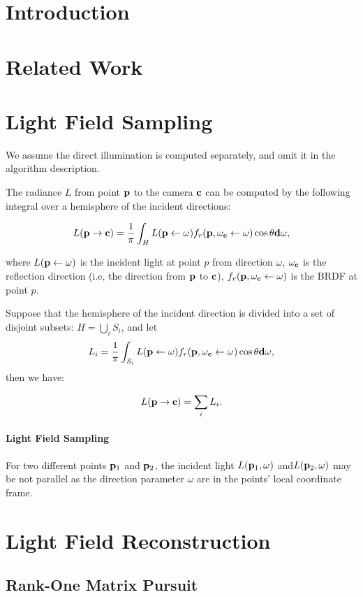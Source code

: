\documentclass[review]{acmsiggraph}
\newcommand{\bfd}{{\bf d}}
\newcommand{\bfp}{{\bf p}}
\newcommand{\bfc}{{\bf c}}
\newcommand{\Equation}[1]{
	\begin{equation}
		#1
	\end{equation}
}
\begin{document}
\section{Introduction}

\section{Related Work}

\section{Light Field Sampling}
We assume the direct illumination is computed separately, and omit it in the algorithm description. 

The radiance $L$ from point $\bfp$ to the camera $\bfc$ can be computed by the following integral over a hemisphere of the incident directions:
\Equation{\nonumber
	L(\bfp\rightarrow \bfc) = \frac{1}{\pi} \int_H L(\bfp \leftarrow \omega) f_r(\bfp, \omega_\bfc \leftarrow \omega) \cos\theta \bfd\omega,
}
where $L(\bfp \leftarrow \omega)$ is the incident light at point $p$ from direction $\omega$, $\omega_\bfc$ is the reflection direction (i.e, the direction from $\bfp$ to $\bfc$), $f_r(\bfp,\omega_\bfc\leftarrow\omega)$ is the BRDF at point $p$.


Suppose that the hemisphere of the incident direction is divided into a set of disjoint subsets: $H = \bigcup_i S_i$, and let 
$$L_i = \frac{1}{\pi} \int_{S_i} L(\bfp \leftarrow \omega) f_r(\bfp, \omega_\bfc \leftarrow \omega) \cos\theta \bfd\omega, $$ then we have:
\Equation{\nonumber
	L(\bfp\rightarrow\bfc)=\sum_i L_i.
}

\paragraph{Light Field Sampling}
For two different points $\bfp_1$ and $\bfp_2$, the incident light $L(\bfp_1,\omega)$ and$L(\bfp_2,\omega)$ may be not parallel as the direction parameter $\omega$ are in the points' local coordinate frame.

\section{Light Field Reconstruction}

\subsection{Rank-One Matrix Pursuit}
\end{document}
